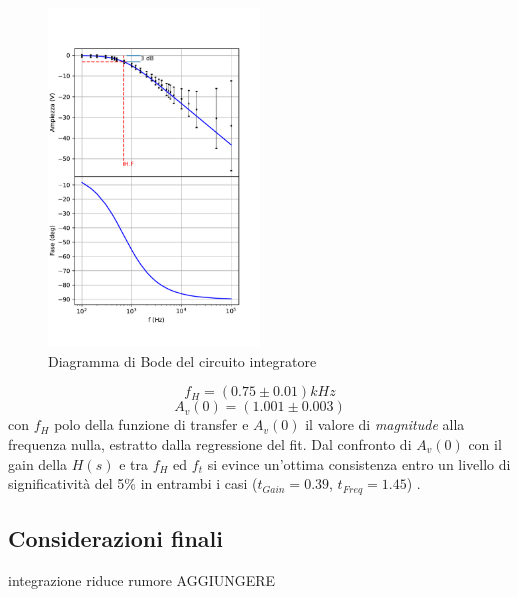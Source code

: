 \documentclass[journal]{IEEEtran}
\begin{document}
\begin{figure}[H]%
\begin {center}
\includegraphics[width=0.50\textwidth]{analysis/output/OPA-integrator_bode(mag+phase).pdf}
\caption{Diagramma di Bode del circuito integratore}
\label{fig:integ-bode}
\end {center}
\end{figure}
\[f_H = (0.75 \pm 0.01) kHz\]
\[A_v(0) = (1.001 \pm 0.003)\]
con $f_H$ polo della funzione di transfer e $A_v(0)$ il valore di \textit{magnitude} alla frequenza nulla, estratto dalla regressione del fit.
Dal confronto di $A_v(0)$ con il gain della $H(s)$ e tra $f_H$ ed $f_t$ si evince un'ottima consistenza entro un livello di significatività del 5\% in entrambi i casi ($t_{Gain} = 0.39 $, $t_{Freq} = 1.45 $) .
\subsection{\textbf{Considerazioni finali}}

integrazione riduce rumore AGGIUNGERE
\end{document}
